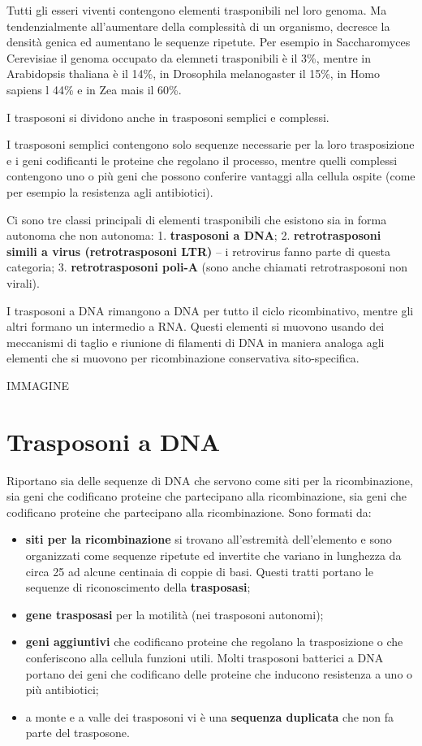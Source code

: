 \documentclass[11pt]{book}
\begin{document}
Tutti gli esseri viventi contengono elementi trasponibili nel loro
genoma. Ma tendenzialmente all'aumentare della complessità di un
organismo, decresce la densità genica ed aumentano le sequenze ripetute.
Per esempio in Saccharomyces Cerevisiae il genoma occupato da elemneti
trasponibili è il 3\%, mentre in Arabidopsis thaliana è il 14\%, in
Drosophila melanogaster il 15\%, in Homo sapiens l 44\% e in Zea mais il
60\%.

I trasposoni si dividono anche in trasposoni semplici e complessi.

I trasposoni semplici contengono solo sequenze necessarie per la loro
trasposizione e i geni codificanti le proteine che regolano il processo,
mentre quelli complessi contengono uno o più geni che possono conferire
vantaggi alla cellula ospite (come per esempio la resistenza agli
antibiotici).

Ci sono tre classi principali di elementi trasponibili che esistono sia
in forma autonoma che non autonoma: 1. \textbf{trasposoni a DNA}; 2.
\textbf{retrotrasposoni simili a virus (retrotrasposoni LTR)} -- i
retrovirus fanno parte di questa categoria; 3. \textbf{retrotrasposoni
poli-A} (sono anche chiamati retrotrasposoni non virali).

I trasposoni a DNA rimangono a DNA per tutto il ciclo ricombinativo,
mentre gli altri formano un intermedio a RNA. Questi elementi si muovono
usando dei meccanismi di taglio e riunione di filamenti di DNA in
maniera analoga agli elementi che si muovono per ricombinazione
conservativa sito-specifica.

IMMAGINE

\section{Trasposoni a DNA}\label{trasposoni-a-dna}

Riportano sia delle sequenze di DNA che servono come siti per la
ricombinazione, sia geni che codificano proteine che partecipano alla
ricombinazione, sia geni che codificano proteine che partecipano alla
ricombinazione. Sono formati da:

\begin{itemize}
\itemsep1pt\parskip0pt
\item
  \textbf{siti per la ricombinazione} si trovano all'estremità
  dell'elemento e sono organizzati come sequenze ripetute ed invertite
  che variano in lunghezza da circa 25 ad alcune centinaia di coppie di
  basi. Questi tratti portano le sequenze di riconoscimento della
  \textbf{trasposasi};
\item
  \textbf{gene trasposasi} per la motilità (nei trasposoni autonomi);
\item
  \textbf{geni aggiuntivi} che codificano proteine che regolano la
  trasposizione o che conferiscono alla cellula funzioni utili. Molti
  trasposoni batterici a DNA portano dei geni che codificano delle
  proteine che inducono resistenza a uno o più antibiotici;
\item
  a monte e a valle dei trasposoni vi è una \textbf{sequenza duplicata}
  che non fa parte del trasposone.
\end{itemize}
\end{document}

